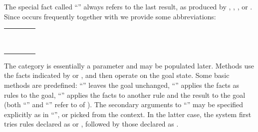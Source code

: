 \begin{isabellebody}
\begin{isamarkuptext}
  The special fact called ``\hyperlink{fact.this}{\mbox{}}'' always refers to the last
  result, as produced by \hyperlink{command.note}{\mbox{}}, \hyperlink{command.assume}{\mbox{}}, \hyperlink{command.have}{\mbox{}}, or \hyperlink{command.show}{\mbox{}}.  Since \hyperlink{command.note}{\mbox{}} occurs
  frequently together with \hyperlink{command.then}{\mbox{}} we provide some
  abbreviations:

  \medskip
  \begin{tabular}{rcl}
    \hyperlink{command.from}{\mbox{\isa{\isacommand{from}}}}~\isa{a} & \isa{{\isaliteral{22}{\isachardoublequote}}{\isaliteral{5C3C65717569763E}{\isasymequiv}}{\isaliteral{22}{\isachardoublequote}}} & \hyperlink{command.note}{\mbox{\isa{\isacommand{note}}}}~\isa{a}~\hyperlink{command.then}{\mbox{\isa{\isacommand{then}}}} \\
    \hyperlink{command.with}{\mbox{\isa{\isacommand{with}}}}~\isa{a} & \isa{{\isaliteral{22}{\isachardoublequote}}{\isaliteral{5C3C65717569763E}{\isasymequiv}}{\isaliteral{22}{\isachardoublequote}}} & \hyperlink{command.from}{\mbox{\isa{\isacommand{from}}}}~\isa{{\isaliteral{22}{\isachardoublequote}}a\ {\isaliteral{5C3C414E443E}{\isasymAND}}\ this{\isaliteral{22}{\isachardoublequote}}} \\
  \end{tabular}
  \medskip

  The  category is essentially a parameter and may be
  populated later.  Methods use the facts indicated by \hyperlink{command.then}{\mbox{}} or \hyperlink{command.using}{\mbox{}}, and then operate on the goal state.
  Some basic methods are predefined: ``\hyperlink{method.-}{\mbox{}}'' leaves the goal
  unchanged, ``\hyperlink{method.this}{\mbox{}}'' applies the facts as rules to the
  goal, ``\hyperlink{method.rule}{\mbox{}}'' applies the facts to another rule and the
  result to the goal (both ``\hyperlink{method.this}{\mbox{}}'' and ``\hyperlink{method.rule}{\mbox{}}''
  refer to \hyperlink{inference.resolution}{\mbox{}} of
  ).  The secondary arguments to
  ``\hyperlink{method.rule}{\mbox{}}'' may be specified explicitly as in ``'', or picked from the context.  In the latter case, the system
  first tries rules declared as \hyperlink{attribute.Pure.elim}{\mbox{}} or
  \hyperlink{attribute.Pure.dest}{\mbox{}}, followed by those declared as \hyperlink{attribute.Pure.intro}{\mbox{}}.


\end{isamarkuptext}
\end{isabellebody}
